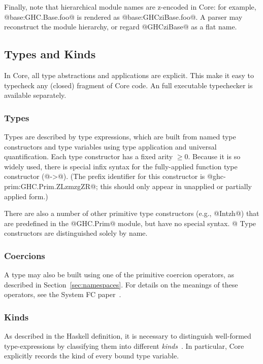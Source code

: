 \documentclass[10pt]{article}
\begin{document}
Finally, note that hierarchical module names are z-encoded in Core: for example, @base:GHC.Base.foo@ is rendered as @base:GHCziBase.foo@. A parser may reconstruct the module hierarchy, or regard @GHCziBase@ as a flat name.
\subsection{Types and Kinds}
\label{sec:typesandkinds}

In Core, all type abstractions and applications are explicit.  This make it easy to 
typecheck any (closed) fragment of Core code.  An full executable typechecker is available separately.

\subsubsection{Types}
Types are described by type expressions, which 
are built from named type constructors and type variables
using type application and universal quantification.  
Each type constructor has a fixed arity $\geq 0$.  
Because it is so widely used, there is
special infix syntax for the fully-applied function type constructor (@->@).
(The prefix identifier for this constructor is @ghc-prim:GHC.Prim.ZLzmzgZR@; this should
only appear in unapplied or partially applied form.)

There are also a number of other primitive type constructors (e.g., @Intzh@) that
are predefined in the @GHC.Prim@ module, but have no special syntax.
@%
Type constructors are distinguished solely by name.

\subsubsection{Coercions}

A type may also be built using one of the primitive coercion operators, as described in Section~\ref{sec:namespaces}. For details on the meanings of these operators, see the System FC paper~\citep{system-fc}.

\subsubsection{Kinds}
As described in the Haskell definition, it is necessary to distinguish 
well-formed type-expressions by classifying them into different {\it kinds}~\citep[41]{haskell98}.
In particular, Core explicitly records the kind of every bound type variable. 
\end{document}
